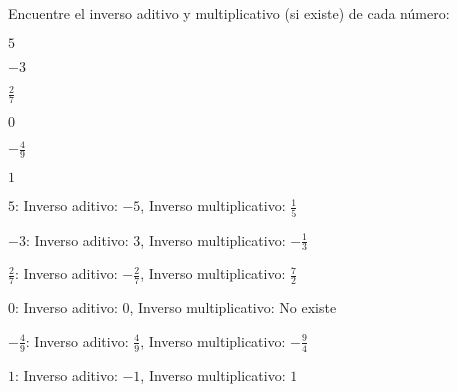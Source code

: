 \begin{exercise}
\problem Encuentre el inverso aditivo y multiplicativo (si existe) de cada número:

\begin{exerciselist}
    \item $5$
    \item $-3$
    \item $\frac{2}{7}$
    \item $0$
    \item $-\frac{4}{9}$
    \item $1$
\end{exerciselist}

\begin{solucion}
\begin{exerciselist}
    \item $5$: Inverso aditivo: $-5$, Inverso multiplicativo: $\frac{1}{5}$
    \item $-3$: Inverso aditivo: $3$, Inverso multiplicativo: $-\frac{1}{3}$
    \item $\frac{2}{7}$: Inverso aditivo: $-\frac{2}{7}$, Inverso multiplicativo: $\frac{7}{2}$
    \item $0$: Inverso aditivo: $0$, Inverso multiplicativo: No existe
    \item $-\frac{4}{9}$: Inverso aditivo: $\frac{4}{9}$, Inverso multiplicativo: $-\frac{9}{4}$
    \item $1$: Inverso aditivo: $-1$, Inverso multiplicativo: $1$
\end{exerciselist}
\end{solucion}
\end{exercise}

